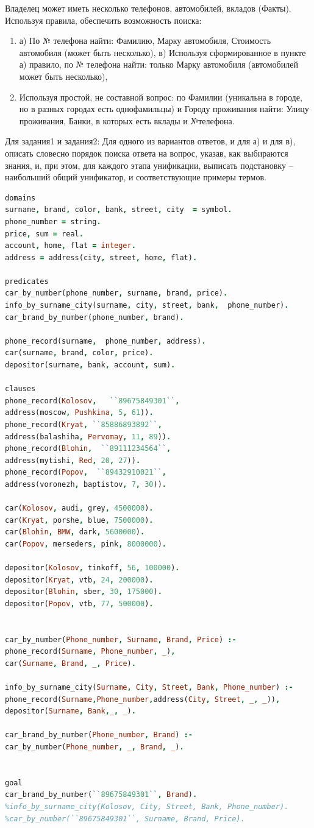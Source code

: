 \documentclass[12pt,a4paper]{article}
\begin{document}
Владелец может иметь несколько телефонов, автомобилей, вкладов (Факты).
Используя правила, обеспечить возможность поиска:
\begin{enumerate}
	\item а) По № телефона найти: Фамилию, Марку автомобиля, Стоимость автомобиля (может быть несколько),
	в) Используя сформированное в пункте а) правило, по № телефона найти: только Марку автомобиля (автомобилей может быть несколько),
	\item Используя простой, не составной вопрос: по Фамилии (уникальна в городе, но в разных городах есть однофамильцы) и Городу проживания найти: Улицу проживания, Банки, в которых есть вклады и №телефона.
\end{enumerate}
Для задания1 и задания2: 
Для одного из вариантов ответов, и для а) и для в), описать словесно порядок поиска ответа на вопрос, указав, как выбираются знания, и, при этом, для каждого этапа унификации, выписать подстановку – наибольший общий унификатор, и соответствующие примеры термов.


\begin{lstlisting}[language=Prolog]
domains
surname, brand, color, bank, street, city  = symbol.
phone_number = string.
price, sum = real.
account, home, flat = integer.
address = address(city, street, home, flat).

predicates
car_by_number(phone_number, surname, brand, price).
info_by_surname_city(surname, city, street, bank,  phone_number).
car_brand_by_number(phone_number, brand).

phone_record(surname,  phone_number, address).
car(surname, brand, color, price).
depositor(surname, bank, account, sum).

clauses
phone_record(Kolosov,   ``89675849301``, 
address(moscow, Pushkina, 5, 61)).
phone_record(Kryat, ``85886893892``, 
address(balashiha, Pervomay, 11, 89)).
phone_record(Blohin,  ``89111234564``, 
address(mytishi, Red, 20, 27)).
phone_record(Popov,  ``89432910021``, 
address(voronezh, baptistov, 7, 30)).

car(Kolosov, audi, grey, 4500000).
car(Kryat, porshe, blue, 7500000).
car(Blohin, BMW, dark, 5600000).
car(Popov, merseders, pink, 8000000).

depositor(Kolosov, tinkoff, 56, 100000).
depositor(Kryat, vtb, 24, 200000).
depositor(Blohin, sber, 30, 175000).
depositor(Popov, vtb, 77, 500000).


car_by_number(Phone_number, Surname, Brand, Price) :- 
phone_record(Surname, Phone_number, _), 
car(Surname, Brand, _, Price).

info_by_surname_city(Surname, City, Street, Bank, Phone_number) :-
phone_record(Surname,Phone_number,address(City, Street, _, _)),
depositor(Surname, Bank,_, _).

car_brand_by_number(Phone_number, Brand) :- 
car_by_number(Phone_number, _, Brand, _).   


goal
car_brand_by_number(``89675849301``, Brand).
%info_by_surname_city(Kolosov, City, Street, Bank, Phone_number).
%car_by_number(``89675849301``, Surname, Brand, Price).
\end{lstlisting}
\end{document}
